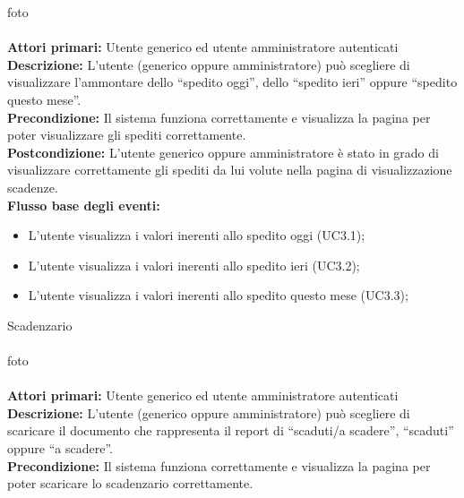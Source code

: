 foto\\\\

\textbf{Attori primari:} Utente generico ed utente amministratore autenticati
\\


\textbf{Descrizione:}  L’utente (generico oppure amministratore) può scegliere di visualizzare l’ammontare dello “spedito oggi”, dello “spedito ieri” oppure “spedito questo mese”.  \\

\textbf{Precondizione:} Il sistema funziona correttamente e visualizza la pagina per poter visualizzare gli spediti correttamente. \\

\textbf{Postcondizione:} L’utente generico oppure amministratore è stato in grado di visualizzare correttamente gli spediti da lui volute nella pagina di visualizzazione scadenze.  \\


\textbf{Flusso base degli eventi:} 

\begin{itemize}

\item L’utente visualizza i valori inerenti allo spedito oggi (UC3.1);
\item L’utente visualizza i valori inerenti allo spedito ieri (UC3.2);
\item L’utente visualizza i valori inerenti allo spedito questo mese (UC3.3);

\end{itemize}


Scadenzario \\\\

foto\\\\

\textbf{Attori primari:} Utente generico ed utente amministratore autenticati
\\


\textbf{Descrizione:}   L’utente (generico oppure amministratore) può scegliere di scaricare il documento che rappresenta il report di “scaduti/a scadere”, “scaduti” oppure “a scadere”.   \\

\textbf{Precondizione:}  Il sistema funziona correttamente e visualizza la pagina per poter scaricare lo scadenzario correttamente. \\

